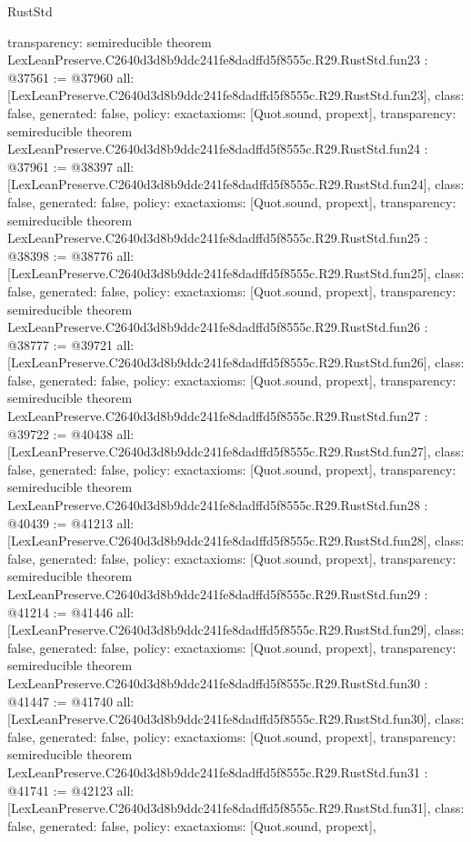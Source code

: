 \begin{lexlean}{RustStd}
\begin{coremodule}
{  transparency: semireducible
}
theorem LexLeanPreserve.C2640d3d8b9ddc241fe8dadffd5f8555c.R29.RustStd.fun23 : @37561 := @37960 {
  all: [LexLeanPreserve.C2640d3d8b9ddc241fe8dadffd5f8555c.R29.RustStd.fun23],
  class: false,
  generated: false,
  policy: exact{axioms: [Quot.sound, propext]},
  transparency: semireducible
}
theorem LexLeanPreserve.C2640d3d8b9ddc241fe8dadffd5f8555c.R29.RustStd.fun24 : @37961 := @38397 {
  all: [LexLeanPreserve.C2640d3d8b9ddc241fe8dadffd5f8555c.R29.RustStd.fun24],
  class: false,
  generated: false,
  policy: exact{axioms: [Quot.sound, propext]},
  transparency: semireducible
}
theorem LexLeanPreserve.C2640d3d8b9ddc241fe8dadffd5f8555c.R29.RustStd.fun25 : @38398 := @38776 {
  all: [LexLeanPreserve.C2640d3d8b9ddc241fe8dadffd5f8555c.R29.RustStd.fun25],
  class: false,
  generated: false,
  policy: exact{axioms: [Quot.sound, propext]},
  transparency: semireducible
}
theorem LexLeanPreserve.C2640d3d8b9ddc241fe8dadffd5f8555c.R29.RustStd.fun26 : @38777 := @39721 {
  all: [LexLeanPreserve.C2640d3d8b9ddc241fe8dadffd5f8555c.R29.RustStd.fun26],
  class: false,
  generated: false,
  policy: exact{axioms: [Quot.sound, propext]},
  transparency: semireducible
}
theorem LexLeanPreserve.C2640d3d8b9ddc241fe8dadffd5f8555c.R29.RustStd.fun27 : @39722 := @40438 {
  all: [LexLeanPreserve.C2640d3d8b9ddc241fe8dadffd5f8555c.R29.RustStd.fun27],
  class: false,
  generated: false,
  policy: exact{axioms: [Quot.sound, propext]},
  transparency: semireducible
}
theorem LexLeanPreserve.C2640d3d8b9ddc241fe8dadffd5f8555c.R29.RustStd.fun28 : @40439 := @41213 {
  all: [LexLeanPreserve.C2640d3d8b9ddc241fe8dadffd5f8555c.R29.RustStd.fun28],
  class: false,
  generated: false,
  policy: exact{axioms: [Quot.sound, propext]},
  transparency: semireducible
}
theorem LexLeanPreserve.C2640d3d8b9ddc241fe8dadffd5f8555c.R29.RustStd.fun29 : @41214 := @41446 {
  all: [LexLeanPreserve.C2640d3d8b9ddc241fe8dadffd5f8555c.R29.RustStd.fun29],
  class: false,
  generated: false,
  policy: exact{axioms: [Quot.sound, propext]},
  transparency: semireducible
}
theorem LexLeanPreserve.C2640d3d8b9ddc241fe8dadffd5f8555c.R29.RustStd.fun30 : @41447 := @41740 {
  all: [LexLeanPreserve.C2640d3d8b9ddc241fe8dadffd5f8555c.R29.RustStd.fun30],
  class: false,
  generated: false,
  policy: exact{axioms: [Quot.sound, propext]},
  transparency: semireducible
}
theorem LexLeanPreserve.C2640d3d8b9ddc241fe8dadffd5f8555c.R29.RustStd.fun31 : @41741 := @42123 {
  all: [LexLeanPreserve.C2640d3d8b9ddc241fe8dadffd5f8555c.R29.RustStd.fun31],
  class: false,
  generated: false,
  policy: exact{axioms: [Quot.sound, propext]},
}
\end{coremodule}
\end{lexlean}
